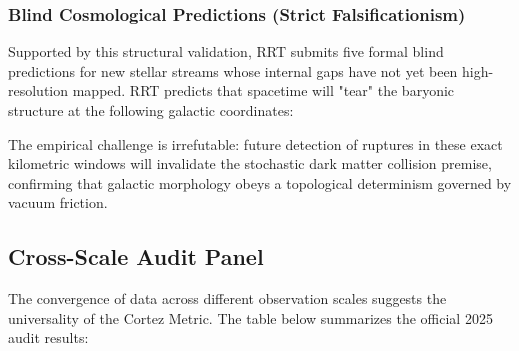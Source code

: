 \documentclass[12pt, a4paper]{article}
\begin{document}
\subsubsection{Blind Cosmological Predictions (Strict Falsificationism)}
Supported by this structural validation, RRT submits five formal blind predictions for new stellar streams whose internal gaps have not yet been high-resolution mapped. RRT predicts that spacetime will "tear" the baryonic structure at the following galactic coordinates:

\begin{table}[H]
\centering
\small
{}
\caption{Blind Prediction of Rupture Zones via Viscous Shear: A deterministic challenge for next-generation telescopes (Nancy Grace Roman/JWST).}
\end{table}

The empirical challenge is irrefutable: future detection of ruptures in these exact kilometric windows will invalidate the stochastic dark matter collision premise, confirming that galactic morphology obeys a topological determinism governed by vacuum friction.

\subsection{Cross-Scale Audit Panel}

The convergence of data across different observation scales suggests the universality of the Cortez Metric. The table below summarizes the official 2025 audit results:
\end{document}
